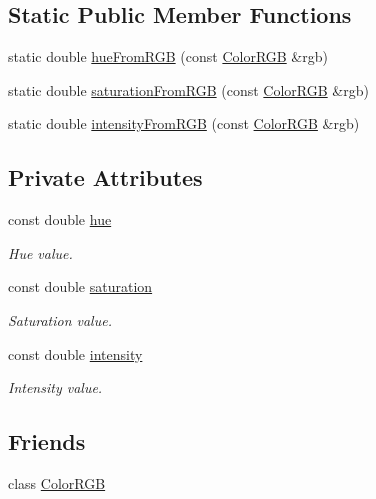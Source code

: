 \subsection*{Static Public Member Functions}
\begin{DoxyCompactItemize}
\item 
static double \hyperlink{classmastermind_1_1logic_1_1_color_h_s_i_a4364b93554d63622bea84177ae3b685a}{hue\+From\+R\+GB} (const \hyperlink{classmastermind_1_1logic_1_1_color_r_g_b}{Color\+R\+GB} \&rgb)
\item 
static double \hyperlink{classmastermind_1_1logic_1_1_color_h_s_i_aea09217f241f3548c3f45e6706596ada}{saturation\+From\+R\+GB} (const \hyperlink{classmastermind_1_1logic_1_1_color_r_g_b}{Color\+R\+GB} \&rgb)
\item 
static double \hyperlink{classmastermind_1_1logic_1_1_color_h_s_i_a921bf6e8d5e9d71d2823b2db2c9c84cb}{intensity\+From\+R\+GB} (const \hyperlink{classmastermind_1_1logic_1_1_color_r_g_b}{Color\+R\+GB} \&rgb)
\end{DoxyCompactItemize}
\subsection*{Private Attributes}
\begin{DoxyCompactItemize}
\item 
const double \hyperlink{classmastermind_1_1logic_1_1_color_h_s_i_a2b0bc5fa75a9c03ffe9ae4ebd9cc786c}{hue}
\begin{DoxyCompactList}\small\item\em Hue value. \end{DoxyCompactList}\item 
const double \hyperlink{classmastermind_1_1logic_1_1_color_h_s_i_a004dfa3a87c92f9890a7fc64b6b08c8f}{saturation}
\begin{DoxyCompactList}\small\item\em Saturation value. \end{DoxyCompactList}\item 
const double \hyperlink{classmastermind_1_1logic_1_1_color_h_s_i_acae1c5e74aae7a627bb1dbcd9f7ee521}{intensity}
\begin{DoxyCompactList}\small\item\em Intensity value. \end{DoxyCompactList}\end{DoxyCompactItemize}
\subsection*{Friends}
\begin{DoxyCompactItemize}
\item 
class \hyperlink{classmastermind_1_1logic_1_1_color_h_s_i_ae698553ee9010de895e223e73387f8dc}{Color\+R\+GB}
\end{DoxyCompactItemize}


